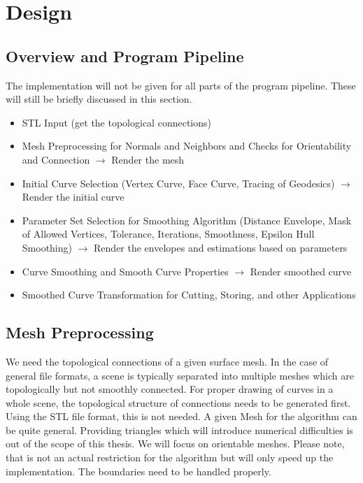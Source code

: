 \documentclass{stdlocal}
\begin{document}
\section{Design} %
\label{sec:design}

\subsection{Overview and Program Pipeline} %
\label{sub:program_pipeline}
  The implementation will not be given for all parts of the program pipeline.
  These will still be briefly discussed in this section.
  \begin{itemize}
    \item STL Input (get the topological connections)
    \item Mesh Preprocessing for Normals and Neighbors and Checks for Orientability and Connection $\rightarrow$ Render the mesh
    \item Initial Curve Selection (Vertex Curve, Face Curve, Tracing of Geodesics) $\rightarrow$ Render the initial curve
    \item Parameter Set Selection for Smoothing Algorithm (Distance Envelope, Mask of Allowed Vertices, Tolerance, Iterations, Smoothness, Epsilon Hull Smoothing) $\rightarrow$ Render the envelopes and estimations based on parameters
    \item Curve Smoothing and Smooth Curve Properties $\rightarrow$ Render smoothed curve
    \item Smoothed Curve Transformation for Cutting, Storing, and other Applications
  \end{itemize}

\subsection{Mesh Preprocessing} %
\label{sub:mesh_preprocessing}
  We need the topological connections of a given surface mesh.
  In the case of general file formats, a scene is typically separated into multiple meshes which are topologically but not smoothly connected.
  For proper drawing of curves in a whole scene, the topological structure of connections needs to be generated first.
  Using the STL file format, this is not needed.
  A given Mesh for the algorithm can be quite general.
  Providing triangles which will introduce numerical difficulties is out of the scope of this thesis.
  We will focus on orientable meshes.
  Please note, that is not an actual restriction for the algorithm but will only speed up the implementation.
  The boundaries need to be handled properly.
\end{document}
